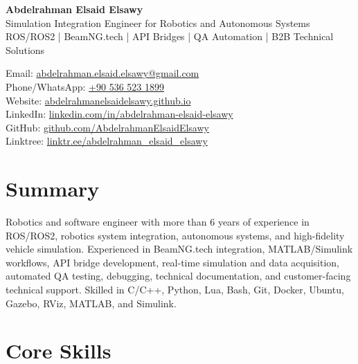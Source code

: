 \documentclass[11pt,a4paper]{article}
\begin{document}

{\LARGE \textbf{Abdelrahman Elsaid Elsawy}}\\
Simulation Integration Engineer for Robotics and Autonomous Systems\\
ROS/ROS2 | BeamNG.tech | API Bridges | QA Automation | B2B Technical Solutions

Email: \href{mailto:abdelrahman.elsaid.elsawy@gmail.com}{abdelrahman.elsaid.elsawy@gmail.com}\\
Phone/WhatsApp: \href{https://wa.me/905365231899}{+90 536 523 1899}\\
Website: \href{https://abdelrahmanelsaidelsawy.github.io/index.html}{abdelrahmanelsaidelsawy.github.io}\\
LinkedIn: \href{https://www.linkedin.com/in/abdelrahman-elsaid-elsawy}{linkedin.com/in/abdelrahman-elsaid-elsawy}\\
GitHub: \href{https://github.com/AbdelrahmanElsaidElsawy}{github.com/AbdelrahmanElsaidElsawy}\\
Linktree: \href{https://linktr.ee/abdelrahman_elsaid_elsawy}{linktr.ee/abdelrahman\_elsaid\_elsawy}

\section*{Summary}

Robotics and software engineer with more than 6 years of experience in ROS/ROS2, robotics system integration, autonomous systems, and high-fidelity vehicle simulation. Experienced in BeamNG.tech integration, MATLAB/Simulink workflows, API bridge development, real-time simulation and data acquisition, automated QA testing, debugging, technical documentation, and customer-facing technical support. Skilled in C/C++, Python, Lua, Bash, Git, Docker, Ubuntu, Gazebo, RViz, MATLAB, and Simulink.

\section*{Core Skills}
\end{document}
